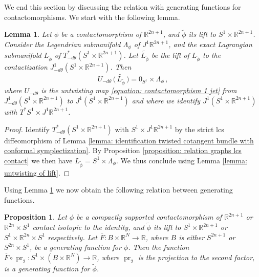 \documentclass{amsart}
\DeclareMathOperator{\pr}{pr}
\newtheorem{prop}[thm]{Proposition}
\newtheorem{lemma}[thm]{Lemma}
\theoremstyle{remark}
\begin{document}
We end this section by discussing the relation
with generating functions for contactomorphisms.
We start with the following lemma.

\begin{lemma}\label{lemma: relation contact case associated Lagrangian}
Let $\phi$ be a contactomorphism of $\mathbb{R}^{2n+1}$,
and $\widetilde{\phi}$ its lift to $S^1 \times \mathbb{R}^{2n+1}$.
Consider the Legendrian submanifold
$\Lambda_{\phi}$ of $J^1 \mathbb{R}^{2n+1}$,
and the exact Lagrangian submanifold $L_{\widetilde{\phi}}$
of $T^{\ast}_{-d\theta} (S^1 \times \mathbb{R}^{2n+1})$.
Let $\widetilde{L_{\widetilde{\phi}}}$
be the lift of $L_{\widetilde{\phi}}$
to the contactization $J^1_{-d\theta} (S^1 \times \mathbb{R}^{2n+1})$.
Then
\[
U_{-d\theta} \, \big( \, \widetilde{L_{\widetilde{\phi}}} \, \big)
= 0_{S^1} \times \Lambda_{\phi} \,,
\]
where $U_{-d\theta}$ is the untwisting map
\eqref{equation: contactomorphism 1 jet}
from $J^1_{-d\theta} (S^1 \times \mathbb{R}^{2n+1})$
to $J^1 (S^1 \times \mathbb{R}^{2n+1})$
and where we identify $J^1 (S^1 \times \mathbb{R}^{2n+1})$
with $T^{\ast}S^1 \times J^1 \mathbb{R}^{2n+1}$.
\end{lemma}

\begin{proof}
Identify $T^{\ast}_{-d\theta} (S^1 \times \mathbb{R}^{2n+1})$
with $S^1 \times J^1 \mathbb{R}^{2n+1}$
by the strict lcs diffeomorphism
of Lemma \ref{lemma: identification twisted cotangent bundle with conformal symplectization}.
By Proposition \ref{proposition: relation graphs lcs contact}
we then have $L_{\widetilde{\phi}} = S^1 \times \Lambda_{\phi}$.
We thus conclude using Lemma \ref{lemma: untwisting of lift}.
\end{proof}

Using Lemma \ref{lemma: relation contact case associated Lagrangian}
we now obtain the following relation between generating functions.

\begin{prop}\label{proposition: relation gf contact}
Let $\phi$ be a compactly supported contactomorphism
of $\mathbb{R}^{2n+1}$ or $\mathbb{R}^{2n} \times S^1$
contact isotopic to the identity,
and $\widetilde{\phi}$ its lift to $S^1 \times \mathbb{R}^{2n+1}$
or $S^1 \times \mathbb{R}^{2n} \times S^1$ respectively.
Let $\overline{F}: B \times \mathbb{R}^N \rightarrow \mathbb{R}$,
where $B$ is either $S^{2n+1}$ or $S^{2n} \times S^1$,
be a generating function for $\phi$.
Then the function
$\overline{F} \circ \pr_2:
S^1 \times (B \times \mathbb{R}^N) \rightarrow \mathbb{R}$,
where $\pr_2$ is the projection to the second factor,
is a generating function for $\widetilde{\phi}$.
\end{prop}
\end{document}
